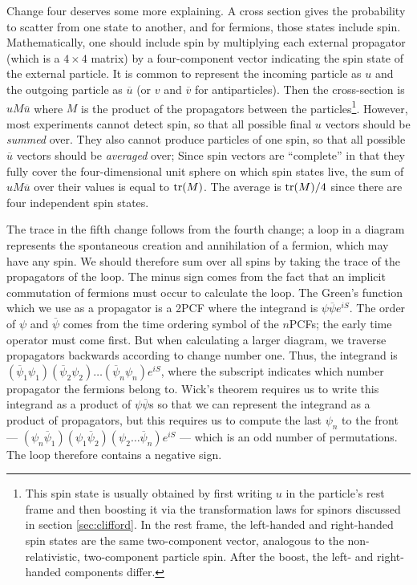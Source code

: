 Change four deserves some more explaining. A cross section gives the probability to scatter from one state to another, and for fermions, those states include spin. Mathematically, one should include spin by multiplying each external propagator (which is a $4\times 4$ matrix) by a four-component vector indicating the spin state of the external particle. It is common to represent the incoming particle as $u$ and the outgoing particle as $\overline u$ (or $v$ and $\overline v$ for antiparticles). Then the cross-section is $uM\overline u$ where $M$ is the product of the propagators between the particles\footnote{This spin state is usually obtained by first writing $u$ in the particle's rest frame and then boosting it via the transformation laws for spinors discussed in section \ref{sec:clifford}. In the rest frame, the left-handed and right-handed spin states are the same two-component vector, analogous to the non-relativistic, two-component particle spin. After the boost, the left- and right-handed components differ.}. However, most experiments cannot detect spin, so that all possible final $u$ vectors should be \emph{summed} over. They also cannot produce particles of one spin, so that all possible $\overline u$ vectors should be \emph{averaged} over; Since spin vectors are ``complete'' in that they fully cover the four-dimensional unit sphere on which spin states live, the sum of $uM\overline u$ over their values is equal to $\operatorname{tr} (M)$. The average is $\operatorname{tr} (M) / 4$ since there are four independent spin states.

The trace in the fifth change follows from the fourth change; a loop in a diagram represents the spontaneous creation and annihilation of a fermion, which may have any spin. We should therefore sum over all spins by taking the trace of the propagators of the loop. The minus sign comes from the fact that an implicit commutation of fermions must occur to calculate the loop. The Green's function which we use as a propagator is a 2PCF where the integrand is $\psi \overline \psi e^{iS}$. The order of $\psi$ and $\overline \psi$ comes from the time ordering symbol of the $n$PCFs; the early time operator must come first. But when calculating a larger diagram, we traverse propagators backwards according to change number one. Thus, the integrand is $(\overline \psi_1 \psi_1) (\overline\psi_2\psi_2)\dots(\overline\psi_n\psi_n) e^{iS}$, where the subscript indicates which number propagator the fermions belong to. Wick's theorem requires us to write this integrand as a product of $\psi \overline \psi$s so that we can represent the integrand as a product of propagators, but this requires us to compute the last $\psi_n$ to the front --- $(\psi_n\overline \psi_1) (\psi_1 \overline\psi_2)(\psi_2\dots\overline\psi_n) e^{iS}$ --- which is an odd number of permutations. The loop therefore contains a negative sign.

